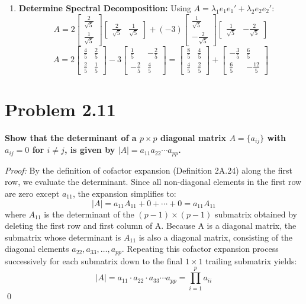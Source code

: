 \documentclass[11pt,letterpaper]{article}
\begin{document}
\begin{enumerate}
    \item[(3)] \textbf{Determine Spectral Decomposition:} 
    Using $A = \lambda_1 e_1 e_1' + \lambda_2 e_2 e_2'$:
    $$A = 2 \begin{bmatrix} \frac{2}{\sqrt{5}} \\ \frac{1}{\sqrt{5}} \end{bmatrix} \begin{bmatrix} \frac{2}{\sqrt{5}} & \frac{1}{\sqrt{5}} \end{bmatrix} + (-3) \begin{bmatrix} \frac{1}{\sqrt{5}} \\ -\frac{2}{\sqrt{5}} \end{bmatrix} \begin{bmatrix} \frac{1}{\sqrt{5}} & -\frac{2}{\sqrt{5}} \end{bmatrix}$$
    $$A = 2 \begin{bmatrix} \frac{4}{5} & \frac{2}{5} \\ \frac{2}{5} & \frac{1}{5} \end{bmatrix} - 3 \begin{bmatrix} \frac{1}{5} & -\frac{2}{5} \\ -\frac{2}{5} & \frac{4}{5} \end{bmatrix} = \begin{bmatrix} \frac{8}{5} & \frac{4}{5} \\ \frac{4}{5} & \frac{2}{5} \end{bmatrix} + \begin{bmatrix} -\frac{3}{5} & \frac{6}{5} \\ \frac{6}{5} & -\frac{12}{5} \end{bmatrix}$$
\end{enumerate}


\section*{Problem 2.11}
\textbf{Show that the determinant of a $p \times p$ diagonal matrix $A = \{a_{ij}\}$ with $a_{ij}=0$ for $i \neq j$, is given by $|A| = a_{11}a_{22}\cdots a_{pp}$.}

\textit{Proof:} By the definition of cofactor expansion (Definition 2A.24) along the first row, we evaluate the determinant. Since all non-diagonal elements in the first row are zero except $a_{11}$, the expansion simplifies to:
$$|A| = a_{11}A_{11} + 0 + \cdots + 0 = a_{11}A_{11}$$
where $A_{11}$ is the determinant of the $(p-1) \times (p-1)$ submatrix obtained by deleting the first row and first column of A. Because A is a diagonal matrix, the submatrix whose determinant is $A_{11}$ is also a diagonal matrix, consisting of the diagonal elements $a_{22}, a_{33}, \dots, a_{pp}$. 
Repeating this cofactor expansion process successively for each submatrix down to the final $1 \times 1$ trailing submatrix yields:
$$|A| = a_{11} \cdot a_{22} \cdot a_{33} \cdots a_{pp} = \prod_{i=1}^{p} a_{ii}$$ \qed
\end{document}
